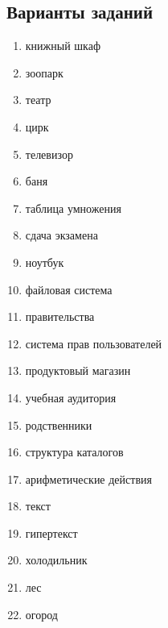 \documentclass[a4paper,12pt]{article}
\begin{document}
\subsection{Варианты заданий}
\begin{enumerate}
	\item книжный шкаф
	\item зоопарк
	\item театр
	\item цирк
	\item телевизор
	\item баня
	\item таблица умножения
	\item сдача экзамена
	\item ноутбук
	\item файловая система
	\item правительства
	\item система прав пользователей
	\item продуктовый магазин
	\item учебная аудитория
	\item родственники
	\item структура каталогов
	\item арифметические действия
	\item текст
	\item гипертекст
	\item холодильник
	\item лес
	\item огород
\end{enumerate}
\end{document}
